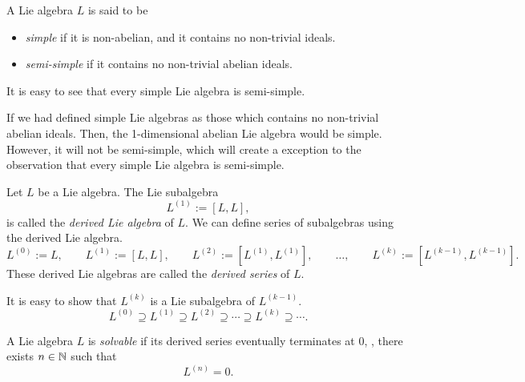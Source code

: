 \begin{definition}
    A Lie algebra \(L\) is said to be
    \begin{itemize}
        \item \emph{simple} if it is non-abelian, and it contains no non-trivial ideals.
        \item \emph{semi-simple} if it contains no non-trivial abelian ideals.
    \end{itemize}
\end{definition}
It is easy to see that every simple Lie algebra is semi-simple.
\begin{remark}
    If we had defined simple Lie algebras as those which contains no non-trivial abelian ideals. Then, the 1-dimensional abelian Lie algebra would be simple. However, it will not be semi-simple, which will create a exception to the observation that every simple Lie algebra is semi-simple.
\end{remark}

\begin{definition}
    Let \(L\) be a Lie algebra. The Lie subalgebra
    \begin{equation*}
        L^{(1)} := [L, L],
    \end{equation*}
    is called the \emph{derived Lie algebra} of \(L\). We can define series of subalgebras using the derived Lie algebra.
    \begin{equation*}
        L^{(0)} := L, \qquad L^{(1)} := [L, L], \qquad L^{(2)} := [L^{(1)}, L^{(1)}], \qquad \ldots, \qquad L^{(k)} := [L^{(k-1)}, L^{(k-1)}].
    \end{equation*}
    These derived Lie algebras are called the \emph{derived series} of \(L\).
\end{definition}
It is easy to show that \(L^{(k)}\) is a Lie subalgebra of \(L^{(k-1)}\).
\begin{equation*}
    L^{(0)} \supseteq L^{(1)} \supseteq L^{(2)} \supseteq \cdots \supseteq L^{(k)} \supseteq \cdots.
\end{equation*}
\begin{definition}
    A Lie algebra \(L\) is \emph{solvable} if its derived series eventually terminates at \(0\), \ie, there exists \(n \in \mathbb N\) such that
    \begin{equation*}
        L^{(n)} = \qty{0}.
    \end{equation*}
\end{definition}

